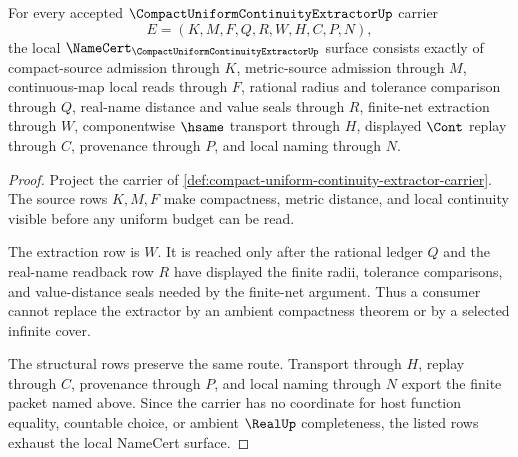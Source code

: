 \begin{theorem}
\label{thm:compact-uniform-continuity-extractor-namecert-obligations}
For every accepted $\CompactUniformContinuityExtractorUp$ carrier
$$
E=(K,M,F,Q,R,W,H,C,P,N),
$$
the local $\NameCert_{\CompactUniformContinuityExtractorUp}$ surface consists exactly of compact-source admission through $K$, metric-source admission through $M$, continuous-map local reads through $F$, rational radius and tolerance comparison through $Q$, real-name distance and value seals through $R$, finite-net extraction through $W$, componentwise $\hsame$ transport through $H$, displayed $\Cont$ replay through $C$, provenance through $P$, and local naming through $N$.
\end{theorem}
\begin{proof}
Project the carrier of \autoref{def:compact-uniform-continuity-extractor-carrier}. The source rows $K,M,F$ make compactness, metric distance, and local continuity visible before any uniform budget can be read.

The extraction row is $W$. It is reached only after the rational ledger $Q$ and the real-name readback row $R$ have displayed the finite radii, tolerance comparisons, and value-distance seals needed by the finite-net argument. Thus a consumer cannot replace the extractor by an ambient compactness theorem or by a selected infinite cover.

The structural rows preserve the same route. Transport through $H$, replay through $C$, provenance through $P$, and local naming through $N$ export the finite packet named above. Since the carrier has no coordinate for host function equality, countable choice, or ambient $\RealUp$ completeness, the listed rows exhaust the local NameCert surface.
\end{proof}



